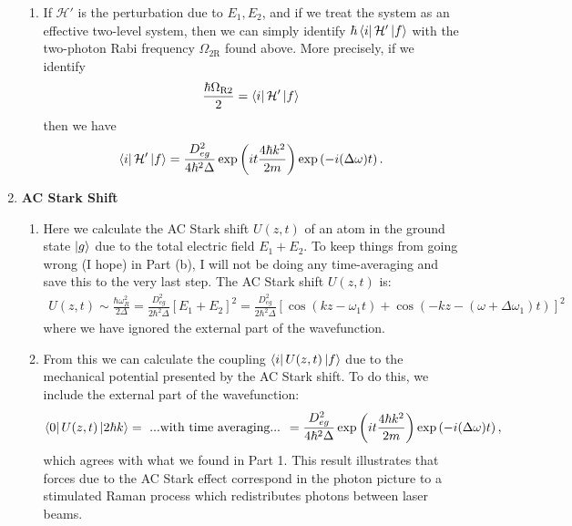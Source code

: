\documentclass{article}
\theoremstyle{definition}
\newcommand{\f}[2]{\frac{#1}{#2}}
\newcommand{\lp}{\left(}
\newcommand{\rp}{\right)}
\newcommand{\lb}{\left[}
\newcommand{\rb}{\right]}
\begin{document}
\begin{enumerate}
\begin{enumerate}[label=(\alph*)]
	\item If $\mathcal{H}'$ is the perturbation due to $E_1, E_2$, and if we treat the system as an effective two-level system, then we can simply identify $\hbar \bra{i}\mathcal{H}'\ket{f}$ with the two-photon Rabi frequency  $\Omega_\text{2R}$ found above. More precisely, if we identify 
	\begin{align*}
	\f{\hbar \Omega_\text{R2} }{2} = \bra{i}\mathcal{H}'\ket{f}
	\end{align*}
	then we have
	\begin{align*}
	\bra{i}\mathcal{H}'\ket{f} = \f{ D^2_{eg}}{4\hbar^2\Delta}\exp\lp it \f{4\hbar k^2}{2m} \rp \exp\lp{-i(\Delta \omega) t}\rp.
	\end{align*}
	\end{enumerate}



	
	
	\item \textbf{AC Stark Shift}
	
	\begin{enumerate}[label=(\alph*)]
		\item Here we calculate the AC Stark shift $U(z,t)$ of an atom in the ground state $\ket{g}$ due to the total electric field $E_1 + E_2$. To keep things from going wrong (I hope) in Part (b), I will not be doing any time-averaging and save this to the very last step. The AC Stark shift $U(z,t)$ is:
		\begin{align*}
		U(z,t) \sim \f{\hbar \omega_R^2}{2\Delta} = \f{D_{eg}^2}{2 \hbar^2\Delta} \lb  E_1 + E_2\rb^2 = \f{D_{eg}^2}{2 \hbar^2 \Delta} \lb \cos(kz - \omega_1 t) + \cos(-kz - (\omega+ \Delta \omega_1 ) t ) \rb^2
		\end{align*}
		where we have ignored the external part of the wavefunction. 
		
		\item From this we can calculate the coupling $\bra{i} U(z,t) \ket{f}$ due to the mechanical potential presented by the AC Stark shift. To do this, we include the external part of the wavefunction:
		\begin{align*}
		\bra{0} U(z,t) \ket{2\hbar k } = \text{ ...with time averaging... } = 
		\f{ D_{eg}^2}{4 \hbar^2 \Delta}\exp\lp it \f{4\hbar k^2}{2m}  \rp \exp\lp -i(\Delta \omega) t \rp,
		\end{align*}
		which agrees with what we found in Part 1. This result illustrates that forces due to the AC Stark effect correspond in the photon picture to a stimulated Raman process which redistributes photons between laser beams. 
		
		
	\end{enumerate}
	
\end{enumerate}
\end{document}
